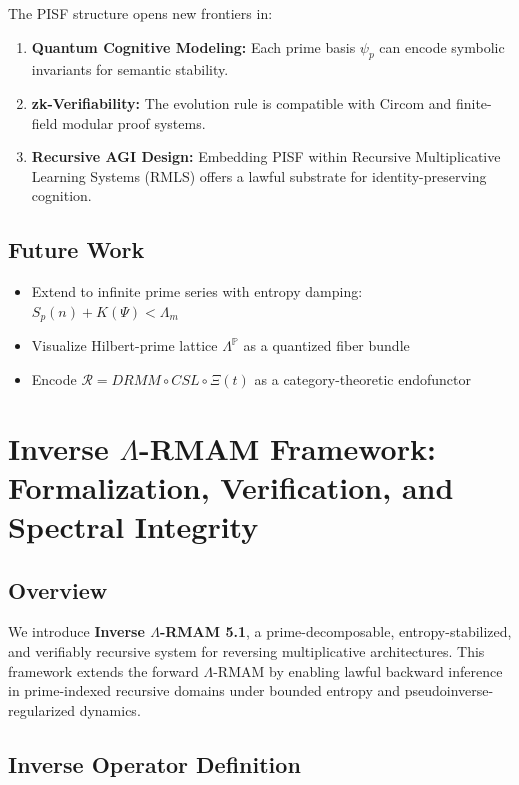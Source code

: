 \documentclass[12]{amsart}
\theoremstyle{plain}
\begin{document}
The PISF structure opens new frontiers in:
\begin{enumerate}
    \item \textbf{Quantum Cognitive Modeling:} Each prime basis $\psi_p$ can encode symbolic invariants for semantic stability.
    \item \textbf{zk-Verifiability:} The evolution rule is compatible with Circom and finite-field modular proof systems.
    \item \textbf{Recursive AGI Design:} Embedding PISF within Recursive Multiplicative Learning Systems (RMLS) offers a lawful substrate for identity-preserving cognition.
\end{enumerate}

\subsection{Future Work}

\begin{itemize}
    \item Extend to infinite prime series with entropy damping: $S_p(n) + K(\Psi) < \Lambda_m$
    \item Visualize Hilbert-prime lattice $\Lambda^{\mathbb{P}}$ as a quantized fiber bundle
    \item Encode $\mathcal{R} = DRMM \circ CSL \circ \Xi(t)$ as a category-theoretic endofunctor
\end{itemize}

\section{Inverse $\Lambda$-RMAM Framework: Formalization, Verification, and Spectral Integrity}

\subsection{Overview}

We introduce \textbf{Inverse $\Lambda$-RMAM 5.1}, a prime-decomposable, entropy-stabilized, and verifiably recursive system for reversing multiplicative architectures. This framework extends the forward $\Lambda$-RMAM by enabling lawful backward inference in prime-indexed recursive domains under bounded entropy and pseudoinverse-regularized dynamics.

\subsection{Inverse Operator Definition}
\end{document}
